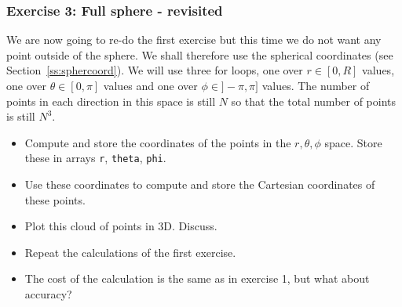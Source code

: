 \subsubsection*{Exercise 3: Full sphere - revisited}

We are now going to re-do the first exercise but this time we do not want any point outside of the sphere. 
We shall therefore use the spherical coordinates (see Section~\ref{ss:sphercoord}).
We will use three for loops, one over $r\in[0,R]$ values, 
one over $\theta\in[0,\pi]$ values and one over $\phi\in]-\pi,\pi]$ values. The number 
of points in each direction in this space is still $N$ so that the total number of points is
still $N^3$.

\begin{itemize}
\item Compute and store the coordinates of the points in the $r,\theta,\phi$ space. Store 
these in arrays {\tt r}, {\tt theta}, {\tt phi}.
\item Use these coordinates to compute and store the Cartesian coordinates of these points. 
\item Plot this cloud of points in 3D. Discuss.
\item Repeat the calculations of the first exercise.
\item The cost of the calculation is the same as in exercise 1, but what about accuracy?
\end{itemize}

